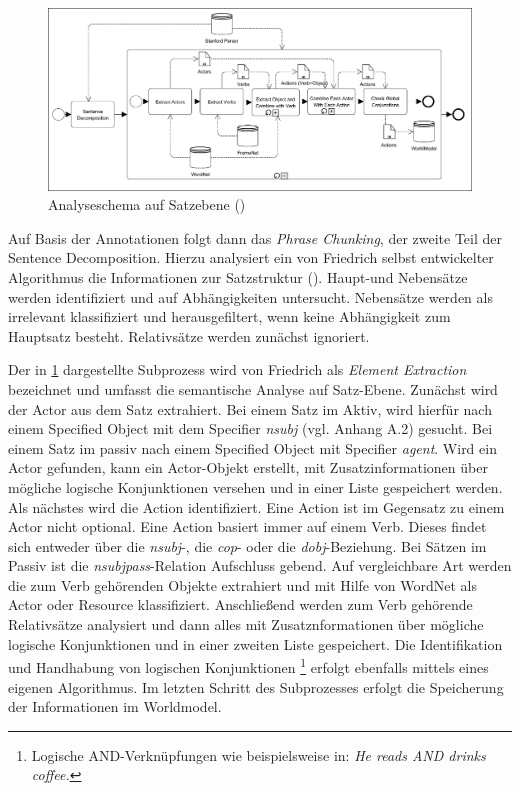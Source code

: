 \begin{figure}[h]
\begin{center}
\includegraphics[keepaspectratio=true, width=\textwidth]{pictures/SentenceLevel.png}
\caption{Analyseschema auf Satzebene (\cite[vgl.][5]{FRIEDRICH2})}
\label{fig:SLEVEL}
\end{center}\end{figure}
Auf Basis der Annotationen folgt dann das \textit{Phrase Chunking}, der zweite Teil der Sentence Decomposition. Hierzu analysiert ein von Friedrich selbst entwickelter Algorithmus die Informationen zur Satzstruktur (\cite[vgl.][49]{FRIEDRICH2}). Haupt-und Nebensätze werden identifiziert und  auf Abhängigkeiten untersucht. Nebensätze werden als irrelevant klassifiziert und herausgefiltert, wenn keine Abhängigkeit zum Hauptsatz besteht. Relativsätze werden zunächst ignoriert.
\par
Der in \ref{fig:SLEVEL} dargestellte Subprozess wird von Friedrich als \textit{Element Extraction} bezeichnet und umfasst die semantische Analyse auf Satz-Ebene. Zunächst wird der Actor aus dem Satz extrahiert. Bei einem Satz im Aktiv, wird hierfür nach einem Specified Object mit dem Specifier \textit{nsubj} (vgl. Anhang A.2) gesucht. Bei einem Satz im passiv nach einem Specified Object mit Specifier \textit{agent}. Wird ein Actor gefunden, kann ein Actor-Objekt erstellt, mit Zusatzinformationen über mögliche logische Konjunktionen versehen und in einer Liste gespeichert werden. Als nächstes wird die Action identifiziert.  Eine Action ist im Gegensatz zu einem Actor nicht optional. Eine Action basiert immer auf einem Verb. Dieses findet sich entweder über die \textit{nsubj}-, die \textit{cop}- oder die \textit{dobj}-Beziehung. Bei Sätzen im Passiv ist die \textit{nsubjpass}-Relation Aufschluss gebend. Auf vergleichbare Art werden die zum Verb gehörenden Objekte extrahiert und mit Hilfe von WordNet als Actor oder Resource klassifiziert. Anschließend werden zum Verb gehörende Relativsätze analysiert und dann alles mit Zusatznformationen über mögliche logische Konjunktionen und in einer zweiten Liste gespeichert. Die Identifikation und Handhabung von logischen Konjunktionen \footnote{Logische AND-Verknüpfungen wie beispielsweise in: \textit{He reads AND drinks coffee.}} erfolgt ebenfalls mittels eines eigenen Algorithmus. Im letzten Schritt des Subprozesses erfolgt die Speicherung der Informationen im Worldmodel.
